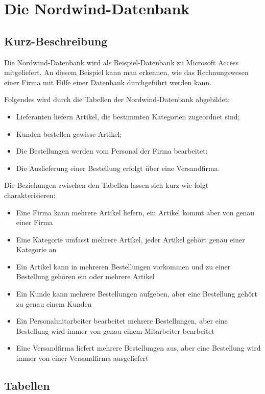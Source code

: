 \section{Die Nordwind-Datenbank}

\subsection{Kurz-Beschreibung}

Die Nordwind-Datenbank wird als Beispiel-Datenbank zu Microsoft Access mitgeliefert. An diesem Beispiel kann man erkennen, wie das Rechnungswesen einer Firma mit Hilfe einer Datenbank durchgeführt werden kann.

Folgendes wird durch die Tabellen der Nordwind-Datenbank abgebildet:
\begin{itemize}
\item Lieferanten liefern Artikel, die bestimmten Kategorien zugeordnet sind;
\item Kunden bestellen gewisse Artikel;
\item Die Bestellungen werden vom Personal der Firma bearbeitet;
\item Die Auslieferung einer Bestellung erfolgt über eine Versandfirma.
\end{itemize}


Die Beziehungen zwischen den Tabellen lassen sich kurz wie folgt charakterisieren:

\begin{itemize}
\item Eine Firma kann mehrere Artikel liefern, ein Artikel kommt aber von genau einer Firma
\item Eine Kategorie umfasst mehrere Artikel, jeder Artikel gehört genau einer Kategorie an
\item Ein Artikel kann in mehreren Bestellungen vorkommen und zu einer Bestellung gehören ein oder mehrere Artikel
\item Ein Kunde kann mehrere Bestellungen aufgeben, aber eine Bestellung gehört zu genau einem Kunden
\item Ein Personalmitarbeiter bearbeitet mehrere Bestellungen, aber eine Bestellung wird immer von genau einem Mitarbeiter bearbeitet
\item Eine Versandfirma liefert mehrere Bestellungen aus, aber eine Bestellung wird immer von einer Versandfirma ausgeliefert
\end{itemize}

\subsection{Tabellen}

